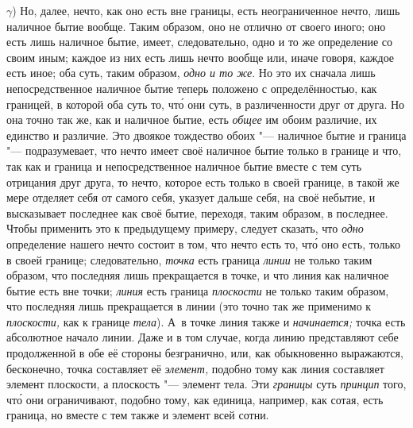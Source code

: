 $\gamma$) Но, далее, нечто, как оно есть вне границы, есть
неограниченное нечто, лишь наличное бытие вообще. Таким образом, оно не
отлично от своего иного; оно есть лишь наличное бытие, имеет,
следовательно, одно и то же определение со своим иным; каждое из них есть
лишь нечто вообще или, иначе говоря, каждое есть иное; оба суть, таким
образом, {\em одно и то же}. Но это их сначала лишь
непосредственное наличное бытие теперь положено с определённостью, как
границей, в которой оба суть то, чт\'{о} они суть, в различенности друг от
друга. Но она точно так же, как и наличное бытие, есть
{\em общее} им обоим различие, их единство и различие.
Это двоякое тождество обоих "--- наличное бытие и граница "--- подразумевает, что
нечто имеет своё наличное бытие только в границе и что, так как и граница и
непосредственное наличное бытие вместе с тем суть отрицания друг друга, то
нечто, которое есть только в своей границе, в такой же мере отделяет себя
от самого себя, указует дальше себя, на своё небытие, и высказывает
последнее как своё бытие, переходя, таким образом, в последнее. Чтобы
применить это к предыдущему примеру, следует сказать, что
{\em одно} определение нашего нечто состоит в том, что
нечто есть то, чт\'{о} оно есть, только в своей границе; следовательно,
{\em точка} есть граница
{\em линии} не только таким образом, что последняя лишь
прекращается в точке, и что линия как наличное бытие есть вне точки;
{\em линия} есть граница
{\em плоскости} не только таким образом, что последняя
лишь прекращается в линии (это точно так же применимо к
{\em плоскости,} как к границе
{\em тела}). А~в точке линия также и
{\em начинается;} точка есть абсолютное начало линии.
Даже и в том случае, когда линию представляют себе продолженной в обе её
стороны безгранично, или, как обыкновенно выражаются, бесконечно, точка
составляет её {\em элемент,} подобно тому как линия
составляет элемент плоскости, а плоскость "--- элемент тела. Эти
{\em границы} суть {\em принцип}
того, чт\'{о} они ограничивают, подобно тому, как единица, например, как сотая,
есть граница, но вместе с тем также и элемент всей сотни.

